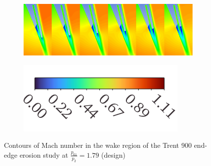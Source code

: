 \documentclass[a4paper, 11pt, oneside]{report}
\begin{document}

\begin{figure}[H]
	\centering
	\begin{subfigure}{.9\textwidth}
		\centering
		\includegraphics[width=\linewidth]{figs/ss_cutbacks_wakes_design_pr.png}
	\end{subfigure}
	\begin{subfigure}{.4\textwidth}
		\centering
		\includegraphics[width=\linewidth]{figs/mach_legend_design_horizontal.png}
	\end{subfigure}
	\caption{Contours of Mach number in the wake region of the Trent 900 end-edge erosion study at $\frac{p_{01}}{p_2}=1.79$ (design)}
      \label{fig:ss_cutbacks_wakes_design_pr}
\end{figure}
\end{document}
